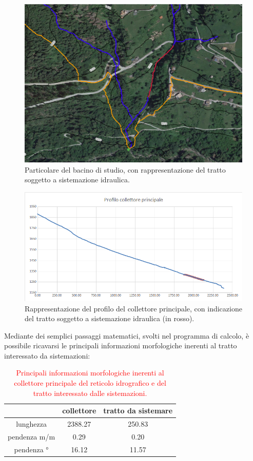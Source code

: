 \begin{figure}[H] \centering
    \includegraphics[scale=0.3]{immagini/pendenza_planimetria_2.png}
    \caption{Particolare del bacino di studio, con rappresentazione del tratto soggetto a sistemazione idraulica.}
    \label{pendenza_planimetria_2}
\end{figure}
\begin{figure}[H] \centering
    \includegraphics[scale=0.5]{immagini/pendenza_collettore.png}
    \caption{Rappresentazione del profilo del collettore principale, con indicazione del tratto soggetto a sistemazione idraulica (in rosso).}
    \label{pendenza_collettore}
\end{figure}
Mediante dei semplici passaggi matematici, svolti nel programma di calcolo, è possibile ricavarsi le principali informazioni morfologiche inerenti al tratto interessato da sistemazioni:
\begin{table}[H] \centering
    \caption{\textcolor{red}{Principali informazioni morfologiche inerenti al collettore principale del reticolo idrografico e del tratto interessato dalle sistemazioni.}}
    \begin{tabular}{ccc}
    \toprule
                 & collettore & tratto da sistemare \\
    \midrule
    lunghezza    & 2388.27    & 250.83              \\
    pendenza m/m & 0.29       & 0.20                \\
    pendenza °   & 16.12      & 11.57               \\
    \bottomrule
    \end{tabular}
\end{table}

